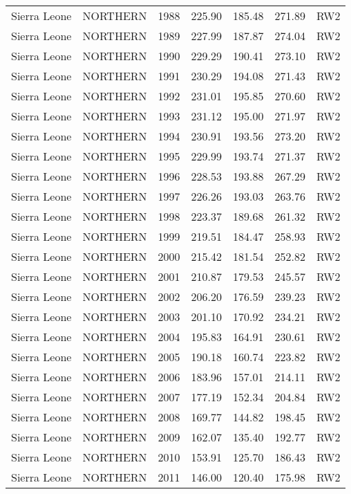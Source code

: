 \begin{longtable}{lllrrrl}
  Sierra Leone & NORTHERN & 1988 & 225.90 & 185.48 & 271.89 & RW2 \\ 
  Sierra Leone & NORTHERN & 1989 & 227.99 & 187.87 & 274.04 & RW2 \\ 
  Sierra Leone & NORTHERN & 1990 & 229.29 & 190.41 & 273.10 & RW2 \\ 
  Sierra Leone & NORTHERN & 1991 & 230.29 & 194.08 & 271.43 & RW2 \\ 
  Sierra Leone & NORTHERN & 1992 & 231.01 & 195.85 & 270.60 & RW2 \\ 
  Sierra Leone & NORTHERN & 1993 & 231.12 & 195.00 & 271.97 & RW2 \\ 
  Sierra Leone & NORTHERN & 1994 & 230.91 & 193.56 & 273.20 & RW2 \\ 
  Sierra Leone & NORTHERN & 1995 & 229.99 & 193.74 & 271.37 & RW2 \\ 
  Sierra Leone & NORTHERN & 1996 & 228.53 & 193.88 & 267.29 & RW2 \\ 
  Sierra Leone & NORTHERN & 1997 & 226.26 & 193.03 & 263.76 & RW2 \\ 
  Sierra Leone & NORTHERN & 1998 & 223.37 & 189.68 & 261.32 & RW2 \\ 
  Sierra Leone & NORTHERN & 1999 & 219.51 & 184.47 & 258.93 & RW2 \\ 
  Sierra Leone & NORTHERN & 2000 & 215.42 & 181.54 & 252.82 & RW2 \\ 
  Sierra Leone & NORTHERN & 2001 & 210.87 & 179.53 & 245.57 & RW2 \\ 
  Sierra Leone & NORTHERN & 2002 & 206.20 & 176.59 & 239.23 & RW2 \\ 
  Sierra Leone & NORTHERN & 2003 & 201.10 & 170.92 & 234.21 & RW2 \\ 
  Sierra Leone & NORTHERN & 2004 & 195.83 & 164.91 & 230.61 & RW2 \\ 
  Sierra Leone & NORTHERN & 2005 & 190.18 & 160.74 & 223.82 & RW2 \\ 
  Sierra Leone & NORTHERN & 2006 & 183.96 & 157.01 & 214.11 & RW2 \\ 
  Sierra Leone & NORTHERN & 2007 & 177.19 & 152.34 & 204.84 & RW2 \\ 
  Sierra Leone & NORTHERN & 2008 & 169.77 & 144.82 & 198.45 & RW2 \\ 
  Sierra Leone & NORTHERN & 2009 & 162.07 & 135.40 & 192.77 & RW2 \\ 
  Sierra Leone & NORTHERN & 2010 & 153.91 & 125.70 & 186.43 & RW2 \\ 
  Sierra Leone & NORTHERN & 2011 & 146.00 & 120.40 & 175.98 & RW2 \\ 

\end{longtable}
